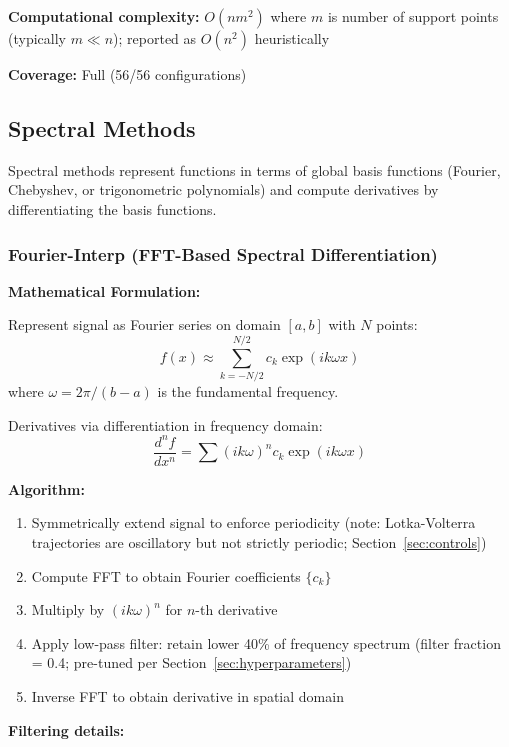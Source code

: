 \textbf{Computational complexity:} $O(n m^2)$ where $m$ is number of support points (typically $m \ll n$); reported as $O(n^2)$ heuristically

\textbf{Coverage:} Full (56/56 configurations)

\subsection{Spectral Methods}
\label{sec:spectral_methods}

Spectral methods represent functions in terms of global basis functions (Fourier, Chebyshev, or trigonometric polynomials) and compute derivatives by differentiating the basis functions.

\subsubsection{Fourier-Interp (FFT-Based Spectral Differentiation)}

\textbf{Mathematical Formulation:}

Represent signal as Fourier series on domain $[a,b]$ with $N$ points:
\begin{equation}
f(x) \approx \sum_{k=-N/2}^{N/2} c_k \exp(i k \omega x)
\end{equation}
where $\omega = 2\pi / (b-a)$ is the fundamental frequency.

Derivatives via differentiation in frequency domain:
\begin{equation}
\frac{d^n f}{dx^n} = \sum (i k \omega)^n c_k \exp(i k \omega x)
\end{equation}

\textbf{Algorithm:}
\begin{enumerate}
    \item Symmetrically extend signal to enforce periodicity (note: Lotka-Volterra trajectories are oscillatory but not strictly periodic; Section~\ref{sec:controls})
    \item Compute FFT to obtain Fourier coefficients $\{c_k\}$
    \item Multiply by $(i k \omega)^n$ for $n$-th derivative
    \item Apply low-pass filter: retain lower 40\% of frequency spectrum (filter fraction = 0.4; pre-tuned per Section~\ref{sec:hyperparameters})
    \item Inverse FFT to obtain derivative in spatial domain
\end{enumerate}

\textbf{Filtering details:} 

